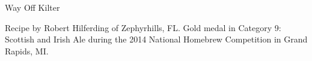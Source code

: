 \begin{recipe}{Way Off Kilter} %

\begin{aboutblock}
Recipe by Robert Hilferding of Zephyrhills, FL. Gold medal in Category 9: Scottish
and Irish Ale during the 2014 National Homebrew Competition in Grand Rapids, MI.
\sourceaha
\end{aboutblock}


\begin{methodandtiming}

\begin{mashsteps}
\end{mashsteps}

\begin{fermentationsteps}
\end{fermentationsteps}

\end{methodandtiming}

\recipebreak

\begin{ingredientsblock}

\begin{malts}
\end{malts}

\begin{hops}
\end{hops}


\end{ingredientsblock}

\end{recipe}
